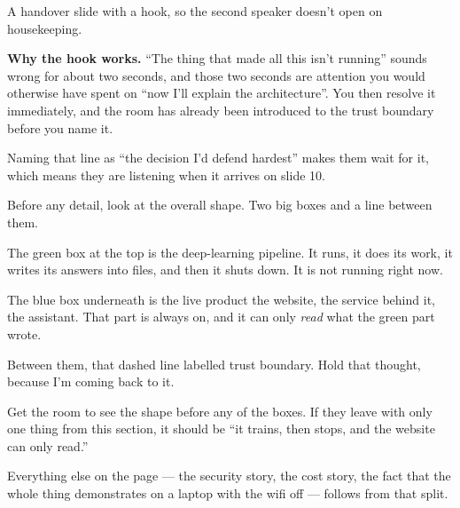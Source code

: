 \documentclass[11pt]{article}
\begin{document}
\begin{means}
A handover slide with a hook, so the second speaker doesn't open on
housekeeping.

\textbf{Why the hook works.} ``The thing that made all this isn't running''
sounds wrong for about two seconds, and those two seconds are attention you
would otherwise have spent on ``now I'll explain the architecture''. You then
resolve it immediately, and the room has already been introduced to the trust
boundary before you name it.

Naming that line as ``the decision I'd defend hardest'' makes them wait for it,
which means they are listening when it arrives on slide 10.
\end{means}


\begin{saythis}
Before any detail, look at the overall shape. Two big boxes and a line between
them.

The green box at the top is the deep-learning pipeline. It runs, it does its
work, it writes its answers into files, and then it shuts down. It is not
running right now.

The blue box underneath is the live product \bt the website, the service behind
it, the assistant. That part is always on, and it can only \emph{read} what the
green part wrote.

Between them, that dashed line labelled trust boundary. Hold that thought,
because I'm coming back to it.
\end{saythis}

\begin{means}
Get the room to see the shape before any of the boxes. If they leave with only
one thing from this section, it should be ``it trains, then stops, and the
website can only read.''

Everything else on the page --- the security story, the cost story, the fact
that the whole thing demonstrates on a laptop with the wifi off --- follows
from that split.
\end{means}


\end{document}
